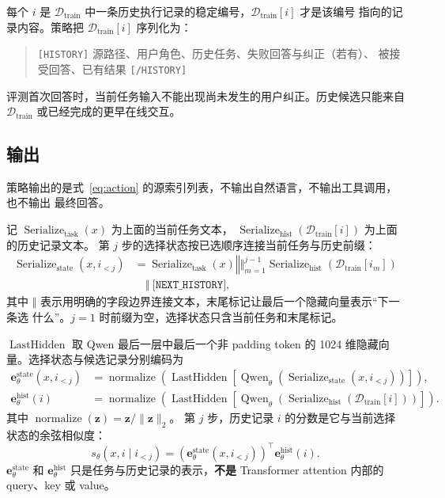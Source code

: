\documentclass[11pt,UTF8,fontset=none]{ctexart}
\newcommand{\Dtrain}{\mathcal D_{\mathrm{train}}}
\begin{document}
每个 \(i\) 是 \(\Dtrain\) 中一条历史执行记录的稳定编号，\(\Dtrain[i]\) 才是该编号
指向的记录内容。策略把 \(\Dtrain[i]\) 序列化为：
\begin{quote}
\texttt{[HISTORY]} 源路径、用户角色、历史任务、失败回答与纠正（若有）、
被接受回答、已有结果
\texttt{[/HISTORY]}
\end{quote}

评测首次回答时，当前任务输入不能出现尚未发生的用户纠正。历史候选只能来自
\(\Dtrain\) 或已经完成的更早在线交互。

\subsection{输出}

策略输出的是式~\eqref{eq:action} 的源索引列表，不输出自然语言，不输出工具调用，也不输出
最终回答。

记 \(\operatorname{Serialize}_{\mathrm{task}}(x)\) 为上面的当前任务文本，
\(\operatorname{Serialize}_{\mathrm{hist}}(\Dtrain[i])\) 为上面的历史记录文本。
第 \(j\) 步的选择状态按已选顺序连接当前任务与历史前缀：
\begin{equation}
  \begin{aligned}
  \operatorname{Serialize}_{\mathrm{state}}(x,i_{<j})
  &=
  \operatorname{Serialize}_{\mathrm{task}}(x)
  \mathbin{\Vert}
  \big\Vert_{m=1}^{j-1}
  \operatorname{Serialize}_{\mathrm{hist}}(\Dtrain[i_m])\\
  &\quad\mathbin{\Vert}\ \texttt{[NEXT\_HISTORY]} ,
  \end{aligned}
  \label{eq:selection-state}
\end{equation}
其中 \(\Vert\) 表示用明确的字段边界连接文本，末尾标记让最后一个隐藏向量表示“下一条选
什么”。\(j=1\) 时前缀为空，选择状态只含当前任务和末尾标记。

\(\operatorname{LastHidden}\) 取 Qwen 最后一层中最后一个非 padding token 的
1024 维隐藏向量。选择状态与候选记录分别编码为
\begin{align}
  \mathbf e_{\theta}^{\mathrm{state}}(x,i_{<j})
  &=
  \operatorname{normalize}
  \left(
    \operatorname{LastHidden}
    \left[
      \operatorname{Qwen}_{\theta}
      \left(\operatorname{Serialize}_{\mathrm{state}}(x,i_{<j})\right)
    \right]
  \right),\\
  \mathbf e_{\theta}^{\mathrm{hist}}(i)
  &=
  \operatorname{normalize}
  \left(
    \operatorname{LastHidden}
    \left[
      \operatorname{Qwen}_{\theta}
      \left(\operatorname{Serialize}_{\mathrm{hist}}(\Dtrain[i])\right)
    \right]
  \right).
\end{align}
其中 \(\operatorname{normalize}(\mathbf z)=\mathbf z/\|\mathbf z\|_2\)。
第 \(j\) 步，历史记录 \(i\) 的分数是它与当前选择状态的余弦相似度：
\begin{equation}
  s_{\theta}(x,i\mid i_{<j})
  =
  \left(\mathbf e_{\theta}^{\mathrm{state}}(x,i_{<j})\right)^\top
  \mathbf e_{\theta}^{\mathrm{hist}}(i).
  \label{eq:score}
\end{equation}
\(\mathbf e_{\theta}^{\mathrm{state}}\) 和
\(\mathbf e_{\theta}^{\mathrm{hist}}\) 只是任务与历史记录的表示，\textbf{不是}
Transformer attention 内部的 query、key 或 value。
\end{document}
